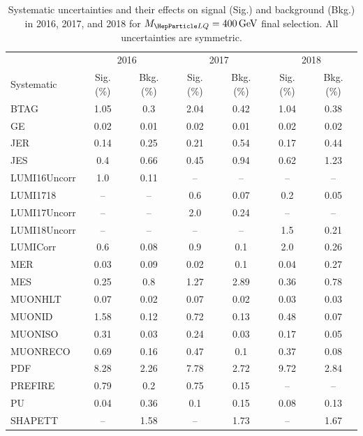 \begin{table}[H]
	\begin{center}
        \begin{footnotesize}
			\caption{Systematic uncertainties and their effects on signal (Sig.) and background (Bkg.) in 2016, 2017, and 2018 for $\MLQ = \SI{400}{GeV}$ final selection. All uncertainties are symmetric.}
			\begin{tabular}{lcccccc} \hline \hline
				& \multicolumn{2}{c}{2016} & \multicolumn{2}{c}{2017} & \multicolumn{2}{c}{2018} \\
				Systematic & Sig. (\%) & Bkg. (\%) & Sig. (\%) & Bkg. (\%) & Sig. (\%) & Bkg. (\%) \\ \hline
				BTAG &  1.05  &  0.3 &  2.04  &  0.42 &  1.04  &  0.38 \\
				GE &  0.02  &  0.01 &  0.02  &  0.01 &  0.02  &  0.02 \\
				JER &  0.14  &  0.25 &  0.21  &  0.54 &  0.17  &  0.44 \\
				JES &  0.4  &  0.66 &  0.45  &  0.94 &  0.62  &  1.23 \\
				LUMI16Uncorr &  1.0  &  0.11 & -- & -- & -- & -- \\
				LUMI1718 & -- & -- &  0.6  &  0.07 &  0.2  &  0.05 \\
				LUMI17Uncorr & -- & -- &  2.0  &  0.24 & -- & -- \\
				LUMI18Uncorr & -- & -- & -- & -- &  1.5  &  0.21 \\
				LUMICorr &  0.6  &  0.08 &  0.9  &  0.1 &  2.0  &  0.26 \\
				MER &  0.03  &  0.09 &  0.02  &  0.1 &  0.04  &  0.27 \\
				MES &  0.25  &  0.8 &  1.27  &  2.89 &  0.36  &  0.78 \\
				MUONHLT &  0.07  &  0.02 &  0.07  &  0.02 &  0.03  &  0.03 \\
				MUONID &  1.58  &  0.12 &  0.72  &  0.13 &  0.48  &  0.07 \\
				MUONISO &  0.31  &  0.03 &  0.24  &  0.03 &  0.17  &  0.05 \\
				MUONRECO &  0.69  &  0.16 &  0.47  &  0.1 &  0.37  &  0.08 \\
				PDF &  8.28  &  2.26 &  7.78  &  2.72 &  9.72  &  2.84 \\
				PREFIRE &  0.79  &  0.2 &  0.75  &  0.15 & -- & -- \\
				PU &  0.04  &  0.36 &  0.1  &  0.15 &  0.08  &  0.13 \\
				SHAPETT & -- &  1.58 & -- &  1.73 & -- &  1.67 \\

\end{tabular}
\end{footnotesize}
\end{center}
\end{table}
